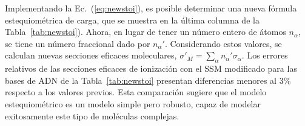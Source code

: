 Implementando la Ec.~(\ref{eq:newstoi}), es posible determinar una nueva 
fórmula estequiométrica de carga, que se muestra en la última columna de 
la Tabla~\ref{tab:newstoi}). Ahora, en lugar de tener un número entero 
de átomos $n_{\alpha}$, se tiene un número fraccional dado por 
$n_{\alpha}'$. Considerando estos valores, se calculan nuevas secciones 
eficaces moleculares, 
$\sigma'_{M}=\sum_{\alpha}n_{\alpha}'\sigma_{\alpha}$. Los errores 
relativos de las secciones eficaces de ionización con el SSM modificado 
para las bases de ADN de la Tabla~\ref{tab:newstoi} presentan 
diferencias menores al 3\% respecto a los valores previos. Esta 
comparación sugiere que el modelo estequiométrico es un modelo simple 
pero robusto, capaz de modelar exitosamente este tipo de moléculas 
complejas.


